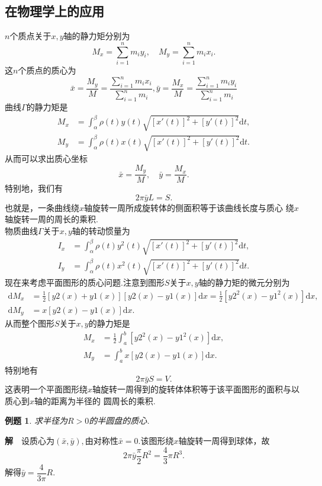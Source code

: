 \documentclass[UTF8]{article}
\newcommand{\dx}{\mathrm{d}x}
\newcommand{\jie}{\textbf{解}$\quad$}
\newtheorem{exa}{\hspace{2em}例题}[section]
\begin{document}
\subsection{在物理学上的应用}
$n$个质点关于$x,y$轴的静力矩分别为
$$M_x=\sum_{i=1}^nm_iy_i,\quad M_y=\sum_{i=1}^nm_ix_i.$$
这$n$个质点的质心为
$$\bar{x}=\frac{M_y}{M}=\frac{\sum_{i=1}^nm_ix_i}{\sum_{i=1}^nm_i},
\bar{y}=\frac{M_x}{M}=\frac{\sum_{i=1}^nm_iy_i}{\sum_{i=1}^nm_i}$$
曲线$\Gamma$的静力矩是
\begin{align*}
  M_x&=\int_\alpha^\beta\rho(t)y(t)\sqrt{[x'(t)]^2+[y'(t)]^2}\mathrm{d}t,\\
  M_y&=\int_\alpha^\beta\rho(t)x(t)\sqrt{[x'(t)]^2+[y'(t)]^2}\mathrm{d}t.
\end{align*}
从而可以求出质心坐标
$$\bar{x}=\frac{M_y}{M},\quad \bar{y}=\frac{M_x}{M}.$$
特别地，我们有
$$2\pi\bar{y}L=S.$$也就是，一条曲线绕$x$轴旋转一周所成旋转体的侧面积等于该曲线长度与质心
绕$x$轴旋转一周的周长的乘积.\\
物质曲线$\Gamma$关于$x,y$轴的转动惯量为
\begin{align*}
  I_x&=\int_\alpha^\beta\rho(t)y^2(t)\sqrt{[x'(t)]^2+[y'(t)]^2}\mathrm{d}t,\\
  I_y&=\int_\alpha^\beta\rho(t)x^2(t)\sqrt{[x'(t)]^2+[y'(t)]^2}\mathrm{d}t.
\end{align*}
现在来考虑平面图形的质心问题.注意到图形$S$关于$x,y$轴的静力矩的微元分别为
\begin{align*}
  \mathrm{d}M_x&=\frac{1}{2}[y2(x)+y1(x)][y2(x)-y1(x)]\dx=\frac{1}{2}[y2^2(x)-y1^2(x)]\dx,\\
  \mathrm{d}M_y&=x[y2(x)-y1(x)]\dx.
\end{align*}
从而整个图形$S$关于$x,y$的静力矩是
\begin{align*}
  M_x&=\frac{1}{2}\int_a^b[y2^2(x)-y1^2(x)]\dx,\\
  M_y&=\int_a^bx[y2(x)-y1(x)]\dx.
\end{align*}
特别地有
$$2\pi\bar{y}S=V.$$
这表明一个平面图形绕$x$轴旋转一周得到的旋转体体积等于该平面图形的面积与以质心到$x$轴的距离为半径的
圆周长的乘积.
\begin{exa}
  求半径为$R>0$的半圆盘的质心.
\end{exa}
\jie 设质心为$(\bar{x},\bar{y}),$由对称性$\bar{x}=0.$该图形绕$x$轴旋转一周得到球体，故
$$2\pi\bar{y}\frac{\pi}{2}R^2=\frac{4}{3}\pi R^3.$$
解得$\bar{y}=\dfrac{4}{3\pi}R.$

\clearpage
\end{document}
